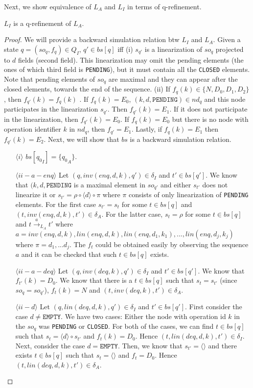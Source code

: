 Next, we show equivalence of $L_A$ and $L_I$ in terms of q-refinement.
\begin{lem} 
$L_I$ is a q-refinement of $L_A$.
\end{lem}
\begin{proof}
We will provide a backward simulation relation btw $L_I$ and $L_A$. Given a state $q = (so_q, f_q) \in Q_I$,  $q' \in bs[q]$ iff (i) $s_{q'}$ is a linearization of $so_q$ projected to $d$ fields (second field). This linearization may omit the pending elements (the ones of which third field is \texttt{PENDING}), but it must contain all the \texttt{CLOSED} elements. Note that pending elements of $so_q$ are maximal and they can appear after the closed elements, towards the end of the sequence. (ii) If $f_q(k) \in \{N, D_0, D_1, D_2\}$, then $f_{q'}(k) = f_q(k)$ . If $f_q(k) = E_0$, $(k,d,\texttt{PENDING}) \in nd_q$ and this node participates in the linearization $s_{q'}$. Then $f_{q'}(k) = E_1$. If it does not participate in the linearization, then $f_{q'}(k) = E_0$. If $f_q(k) = E_0$ but there is no node with operation identifier $k$ in $nd_q$, then $f_{q'} = E_1$. Lastly, if $f_q(k) = E_1$ then $f_{q'}(k) = E_2$. Next, we will show that $bs$ is a backward simulation relation.
\begin{itemize}
\item[$\langle i \rangle$] $bs[{q_0}_I] = \{ {q_0}_A \}$.
\item[$\langle ii-a-enq \rangle$] Let $(q, inv(enq,d,k), q') \in \delta_I$ and $t' \in bs[q']$. We know that $(k,d,\texttt{PENDING}$ is a maximal element in $so_{q'}$ and either $s_{t'}$ does not linearize it or $s_{t'} = \rho \circ \langle d \rangle \circ \pi$ where $\pi$ consists of only linearization of \texttt{PENDING} elements. For the first case $s_{t'} = s_t$ for some $t \in bs[q]$ and $(t,inv(enq,d,k),t') \in \delta_A$. For the latter case, $s_t = \rho$ for some $t \in bs[q]$ and $t \xrightarrow{a}_{L_A} t'$ where $a = inv(enq,d,k), lin(enq,d,k), lin(enq,d_1,k_1),...,lin(enq,d_j,k_j)$ where $\pi = d_1,...d_j$. The $f_t$ could be obtained easily by observing the sequence $a$ and it can be checked that such $t \in bs[q]$ exists.
\item[$\langle ii-a-deq \rangle$] Let $(q, inv(deq,k), q') \in \delta_I$ and $t' \in bs[q']$. We know that $f_{t'}(k) = D_0$. We know that there is a $t \in bs[q]$ such that $s_t = s_{t'}$ (since $so_q = so_{q'}$), $f_t(k) = N$ and $(t,inv(deq,k),t') \in \delta_A$.
\item[$\langle ii-d \rangle$] Let $(q,lin(deq,d,k),q') \in \delta_I$ and $t' \in bs[q']$. First consider the case $d \neq \texttt{EMPTY}$. We have two cases: Either the node with operation id $k$ in the $so_q$ was \texttt{PENDING} or \texttt{CLOSED}. For both of the cases, we can find $t \in bs[q]$ such that $s_t = \langle d \rangle \circ s_{t'}$ and $f_t(k) = D_0$. Hence $(t,lin(deq,d,k),t') \in \delta_I$. Next, consider the case $d = \texttt{EMPTY}$. Then, we know that $s_{t'} = \langle \rangle$ and there exists $t \in bs[q]$ such that $s_t = \langle \rangle$ and $f_t = D_0$. Hence $(t,lin(deq,d,k),t') \in \delta_A$.

\end{itemize}
\end{proof}
